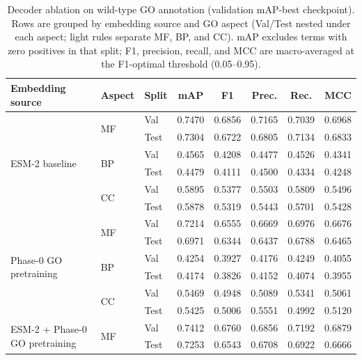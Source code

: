 \documentclass[11pt,a4paper]{article}
\begin{document}
\begin{table}[H]
\centering
\scriptsize
\setlength{\tabcolsep}{3.5pt}
\renewcommand{\arraystretch}{1.08}
\newcommand{\decaspectsep}{\addlinespace[5pt]\cline{2-8}\addlinespace[3pt]}
\caption{Decoder ablation on wild-type GO annotation (validation mAP-best checkpoint). Rows are grouped by embedding source and GO aspect (Val/Test nested under each aspect; light rules separate MF, BP, and CC). mAP excludes terms with zero positives in that split; F1, precision, recall, and MCC are macro-averaged at the F1-optimal threshold (0.05--0.95).}
\label{tab:decoder-ablation}
\begin{tabular}{@{}l l l ccccc@{}}
\toprule
\textbf{Embedding source} & \textbf{Aspect} & \textbf{Split} & mAP & F1 & Prec. & Rec. & MCC \\
\midrule
\multirow{6}{*}{\parbox{2.2cm}{\raggedright ESM-2 baseline}}
 & \multirow{2}{*}{MF} & Val  & 0.7470 & 0.6856 & 0.7165 & 0.7039 & 0.6968 \\
 &  & Test & 0.7304 & 0.6722 & 0.6805 & 0.7134 & 0.6833 \\
\decaspectsep
 & \multirow{2}{*}{BP} & Val  & 0.4565 & 0.4208 & 0.4477 & 0.4526 & 0.4341 \\
 &  & Test & 0.4479 & 0.4111 & 0.4500 & 0.4334 & 0.4248 \\
\decaspectsep
 & \multirow{2}{*}{CC} & Val  & 0.5895 & 0.5377 & 0.5503 & 0.5809 & 0.5496 \\
 &  & Test & 0.5878 & 0.5319 & 0.5443 & 0.5701 & 0.5428 \\
\midrule
\multirow{6}{*}{\parbox{2.2cm}{\raggedright Phase-0 GO pretraining}}
 & \multirow{2}{*}{MF} & Val  & 0.7214 & 0.6555 & 0.6669 & 0.6976 & 0.6676 \\
 &  & Test & 0.6971 & 0.6344 & 0.6437 & 0.6788 & 0.6465 \\
\decaspectsep
 & \multirow{2}{*}{BP} & Val  & 0.4254 & 0.3927 & 0.4176 & 0.4249 & 0.4055 \\
 &  & Test & 0.4174 & 0.3826 & 0.4152 & 0.4074 & 0.3955 \\
\decaspectsep
 & \multirow{2}{*}{CC} & Val  & 0.5469 & 0.4948 & 0.5089 & 0.5341 & 0.5061 \\
 &  & Test & 0.5425 & 0.5006 & 0.5551 & 0.4992 & 0.5120 \\
\midrule
\multirow{6}{*}{\parbox{2.2cm}{\raggedright ESM-2 + Phase-0 GO pretraining}}
 & \multirow{2}{*}{MF} & Val  & 0.7412 & 0.6760 & 0.6856 & 0.7192 & 0.6879 \\
 &  & Test & 0.7253 & 0.6543 & 0.6708 & 0.6922 & 0.6666 \\

\end{tabular}
\end{table}
\end{document}
